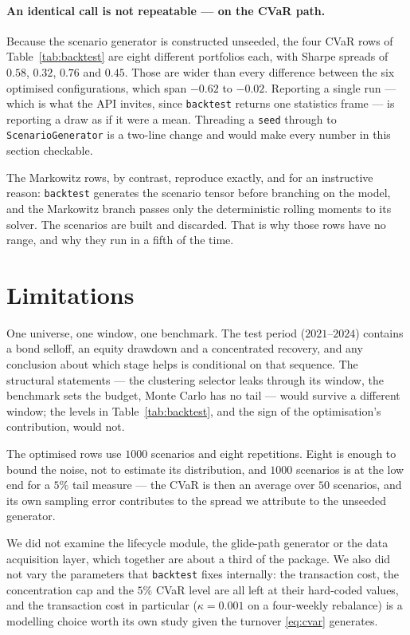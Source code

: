 \documentclass[11pt,a4paper]{article}
\newcommand{\code}[1]{\texttt{#1}}
\begin{document}
\paragraph{An identical call is not repeatable --- on the CVaR path.}
Because the scenario generator is constructed unseeded, the four CVaR rows of
Table~\ref{tab:backtest} are eight different portfolios each, with Sharpe
spreads of $0.58$, $0.32$, $0.76$ and $0.45$. Those are wider than every
difference between the six optimised configurations, which span $-0.62$ to
$-0.02$. Reporting a single run --- which is
what the API invites, since \code{backtest} returns one statistics frame --- is
reporting a draw as if it were a mean. Threading a \code{seed} through to
\code{ScenarioGenerator} is a two-line change and would make every number in
this section checkable.

The Markowitz rows, by contrast, reproduce exactly, and for an instructive
reason: \code{backtest} generates the scenario tensor before branching on the
model, and the Markowitz branch passes only the deterministic rolling moments to
its solver. The scenarios are built and discarded. That is why those rows have no
range, and why they run in a fifth of the time.

\section{Limitations}

One universe, one window, one benchmark. The test period
($2021$--$2024$) contains a bond selloff, an equity drawdown and a concentrated
recovery, and any conclusion about which stage helps is conditional on that
sequence. The structural statements --- the clustering selector leaks through
its window, the benchmark sets the budget, Monte Carlo has no tail --- would
survive a different window; the levels in Table~\ref{tab:backtest}, and the sign
of the optimisation's contribution, would not.

The optimised rows use $1000$ scenarios and eight repetitions. Eight is enough
to bound the noise, not to estimate its distribution, and $1000$ scenarios is
at the low end for a $5\%$ tail measure --- the CVaR is then an average over
$50$ scenarios, and its own sampling error contributes to the spread we
attribute to the unseeded generator.

We did not examine the lifecycle module, the glide-path generator or the data
acquisition layer, which together are about a third of the package. We also did
not vary the parameters that \code{backtest} fixes internally: the transaction
cost, the concentration cap and the $5\%$ CVaR level are all left at their
hard-coded values, and the transaction cost in particular ($\kappa = 0.001$ on
a four-weekly rebalance) is a modelling choice worth its own study given the
turnover \eqref{eq:cvar} generates.
\end{document}
